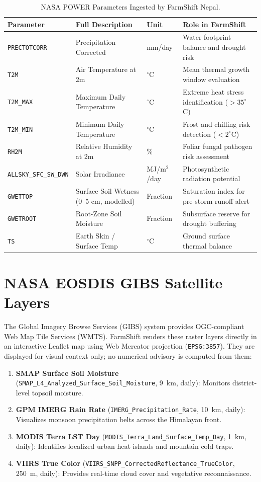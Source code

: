 \documentclass[11pt,a4paper]{report}
\begin{document}
\begin{table}[htbp]
\centering
\small
\caption{NASA POWER Parameters Ingested by FarmShift Nepal.}
\label{tab:nasapower}
\begin{tabularx}{\textwidth}{lllX}
\toprule
\textbf{Parameter} & \textbf{Full Description} & \textbf{Unit} & \textbf{Role in FarmShift} \\
\midrule
\texttt{PRECTOTCORR} & Precipitation Corrected & mm/day & Water footprint balance and drought risk \\
\texttt{T2M} & Air Temperature at 2m & $^\circ$C & Mean thermal growth window evaluation \\
\texttt{T2M\_MAX} & Maximum Daily Temperature & $^\circ$C & Extreme heat stress identification ($>35^\circ$C) \\
\texttt{T2M\_MIN} & Minimum Daily Temperature & $^\circ$C & Frost and chilling risk detection ($<2^\circ$C) \\
\texttt{RH2M} & Relative Humidity at 2m & \% & Foliar fungal pathogen risk assessment \\
\texttt{ALLSKY\_SFC\_SW\_DWN} & Solar Irradiance & MJ/m$^2$/day & Photosynthetic radiation potential \\
\texttt{GWETTOP} & Surface Soil Wetness (0--5 cm, modelled) & Fraction & Saturation index for pre-storm runoff alert \\
\texttt{GWETROOT} & Root-Zone Soil Moisture & Fraction & Subsurface reserve for drought buffering \\
\texttt{TS} & Earth Skin / Surface Temp & $^\circ$C & Ground surface thermal balance \\
\bottomrule
\end{tabularx}
\end{table}

\section{NASA EOSDIS GIBS Satellite Layers}
The Global Imagery Browse Services (GIBS) system provides OGC-compliant Web Map Tile Services (WMTS). FarmShift renders these raster layers directly in an interactive Leaflet map using Web Mercator projection (\texttt{EPSG:3857}). They are displayed for visual context only; no numerical advisory is computed from them:
\begin{enumerate}
  \item \textbf{SMAP Surface Soil Moisture} (\texttt{SMAP\_L4\_Analyzed\_Surface\_Soil\_Moisture}, 9~km, daily): Monitors district-level topsoil moisture.
  \item \textbf{GPM IMERG Rain Rate} (\texttt{IMERG\_Precipitation\_Rate}, 10~km, daily): Visualizes monsoon precipitation belts across the Himalayan front.
  \item \textbf{MODIS Terra LST Day} (\texttt{MODIS\_Terra\_Land\_Surface\_Temp\_Day}, 1~km, daily): Identifies localized urban heat islands and mountain cold traps.
  \item \textbf{VIIRS True Color} (\texttt{VIIRS\_SNPP\_CorrectedReflectance\_TrueColor}, 250~m, daily): Provides real-time cloud cover and vegetative reconnaissance.
\end{enumerate}
\end{document}
